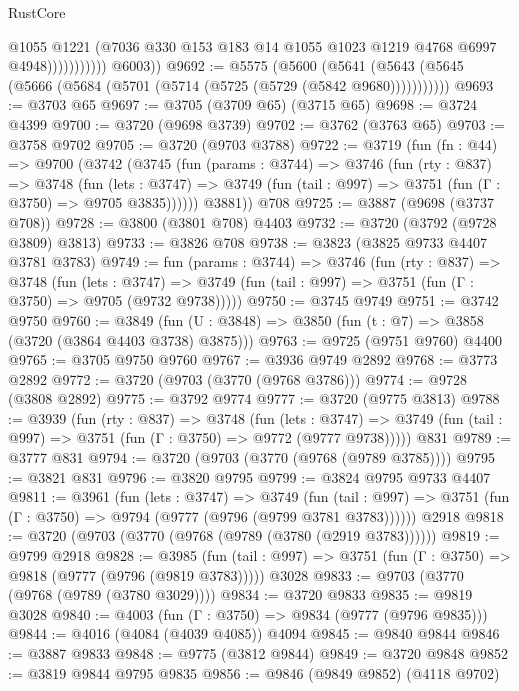 \begin{lexlean}{RustCore}
\begin{coremodule}
                            @1055
                            @1221
                            (@7036 @330 @153 @183 @14 @1055 @1023 @1219 @4768 @6997 @4948)))))))))))
        @6003))
@9692 := @5575
    (@5600 (@5641 (@5643 (@5645 (@5666 (@5684 (@5701 (@5714 (@5725 (@5729 (@5842 @9680)))))))))))
@9693 := @3703 @65
@9697 := @3705 (@3709 @65) (@3715 @65)
@9698 := @3724 @4399
@9700 := @3720 (@9698 @3739)
@9702 := @3762 (@3763 @65)
@9703 := @3758 @9702
@9705 := @3720 (@9703 @3788)
@9722 := @3719
    (fun (fn : @44) =>
    @9700
      (@3742
        (@3745
          (fun (params : @3744) =>
          @3746
            (fun (rty : @837) =>
            @3748
              (fun (lets : @3747) =>
              @3749 (fun (tail : @997) => @3751 (fun (Γ : @3750) => @9705 @3835))))))
        @3881))
    @708
@9725 := @3887 (@9698 (@3737 @708))
@9728 := @3800 (@3801 @708) @4403
@9732 := @3720 (@3792 (@9728 @3809) @3813)
@9733 := @3826 @708
@9738 := @3823 (@3825 @9733 @4407 @3781 @3783)
@9749 := fun (params : @3744) =>
  @3746
    (fun (rty : @837) =>
    @3748
      (fun (lets : @3747) =>
      @3749 (fun (tail : @997) => @3751 (fun (Γ : @3750) => @9705 (@9732 @9738)))))
@9750 := @3745 @9749
@9751 := @3742 @9750
@9760 := @3849 (fun (U : @3848) => @3850 (fun (t : @7) => @3858 (@3720 (@3864 @4403 @3738) @3875)))
@9763 := @9725 (@9751 @9760) @4400
@9765 := @3705 @9750 @9760
@9767 := @3936 @9749 @2892
@9768 := @3773 @2892
@9772 := @3720 (@9703 (@3770 (@9768 @3786)))
@9774 := @9728 (@3808 @2892)
@9775 := @3792 @9774
@9777 := @3720 (@9775 @3813)
@9788 := @3939
    (fun (rty : @837) =>
    @3748
      (fun (lets : @3747) =>
      @3749 (fun (tail : @997) => @3751 (fun (Γ : @3750) => @9772 (@9777 @9738)))))
    @831
@9789 := @3777 @831
@9794 := @3720 (@9703 (@3770 (@9768 (@9789 @3785))))
@9795 := @3821 @831
@9796 := @3820 @9795
@9799 := @3824 @9795 @9733 @4407
@9811 := @3961
    (fun (lets : @3747) =>
    @3749
      (fun (tail : @997) => @3751 (fun (Γ : @3750) => @9794 (@9777 (@9796 (@9799 @3781 @3783))))))
    @2918
@9818 := @3720 (@9703 (@3770 (@9768 (@9789 (@3780 (@2919 @3783))))))
@9819 := @9799 @2918
@9828 := @3985
    (fun (tail : @997) => @3751 (fun (Γ : @3750) => @9818 (@9777 (@9796 (@9819 @3783)))))
    @3028
@9833 := @9703 (@3770 (@9768 (@9789 (@3780 @3029))))
@9834 := @3720 @9833
@9835 := @9819 @3028
@9840 := @4003 (fun (Γ : @3750) => @9834 (@9777 (@9796 @9835)))
@9844 := @4016 (@4084 (@4039 @4085)) @4094
@9845 := @9840 @9844
@9846 := @3887 @9833
@9848 := @9775 (@3812 @9844)
@9849 := @3720 @9848
@9852 := @3819 @9844 @9795 @9835
@9856 := @9846 (@9849 @9852) (@4118 @9702)

\end{coremodule}
\end{lexlean}

